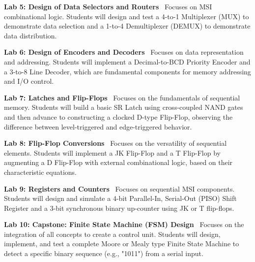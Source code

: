 \noindent\textbf{Lab 5: Design of Data Selectors and Routers} \
Focuses on MSI combinational logic. Students will design and test a 4-to-1 Multiplexer (MUX) to demonstrate data selection and a 1-to-4 Demultiplexer (DEMUX) to demonstrate data distribution. \\

\vspace{0.2cm}

\noindent\textbf{Lab 6: Design of Encoders and Decoders} \
Focuses on data representation and addressing. Students will implement a Decimal-to-BCD Priority Encoder and a 3-to-8 Line Decoder, which are fundamental components for memory addressing and I/O control. \\

\vspace{0.2cm}

\noindent\textbf{Lab 7: Latches and Flip-Flops} \
Focuses on the fundamentals of sequential memory. Students will build a basic SR Latch using cross-coupled NAND gates and then advance to constructing a clocked D-type Flip-Flop, observing the difference between level-triggered and edge-triggered behavior. \\

\vspace{0.2cm}

\noindent\textbf{Lab 8: Flip-Flop Conversions} \
Focuses on the versatility of sequential elements. Students will implement a JK Flip-Flop and a T Flip-Flop by augmenting a D Flip-Flop with external combinational logic, based on their characteristic equations. \\

\vspace{0.2cm}

\noindent\textbf{Lab 9: Registers and Counters} \
Focuses on sequential MSI components. Students will design and simulate a 4-bit Parallel-In, Serial-Out (PISO) Shift Register and a 3-bit synchronous binary up-counter using JK or T flip-flops. \\

\vspace{0.2cm}

\noindent\textbf{Lab 10: Capstone: Finite State Machine (FSM) Design} \
Focuses on the integration of all concepts to create a control unit. Students will design, implement, and test a complete Moore or Mealy type Finite State Machine to detect a specific binary sequence (e.g., "1011") from a serial input.

\newpage
{}